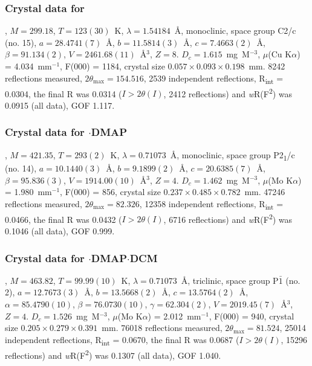 \begin{refsection}
\subsubsection{Crystal data for \texorpdfstring{}{C14 H8 N2 O Se}}
, $M=299.18$, $T=123(30)$~K, $\lambda=1.54184$~\AA, monoclinic, space group C2/c (no. 15), $a = 28.4741(7)$~\AA, $b = 11.5814(3)$~\AA, $c = 7.4663(2)$~\AA, $\beta = 91.134(2)$\degree, $V = 2461.68(11)$~\AA$^{3}$, $Z = 8$. $D_{c}= 1.615$~mg~M$^{-3}$, $\mu$(Cu K$\alpha$) = 4.034~mm$^{-1}$, F(000) = 1184, crystal size $0.057 \times 0.093 \times 0.198$~mm. 8242 reflections measured, $2\theta_{\mathrm{max}}=154.516$\degree, 2539 independent reflections, R\textsubscript{int} = 0.0304, the final R was 0.0314 ($I > 2\theta(I)$, 2412 reflections) and \emph{w}R(F\textsuperscript{2}) was 0.0915 (all data), GOF 1.117.

\subsubsection{Crystal data for \texorpdfstring{$\cdot$DMAP}{C21 H18 N4 O Se}}
, $M=421.35$, $T=293(2)$~K, $\lambda=0.71073$~\AA, monoclinic, space group P2\textsubscript{1}/c (no. 14), $a = 10.1440(3)$~\AA, $b = 9.1899(2)$~\AA, $c = 20.6385(7)$~\AA, $\beta = 95.836(3)$\degree, $V = 1914.00(10)$~\AA$^{3}$, $Z = 4$. $D_{c}= 1.462$~mg~M$^{-3}$, $\mu$(Mo K$\alpha$) = 1.980~mm$^{-1}$, F(000) = 856, crystal size $0.237 \times 0.485 \times 0.782$~mm. 47246 reflections measured, $2\theta_{\mathrm{max}}=82.326$\degree, 12358 independent reflections, R\textsubscript{int} = 0.0466, the final R was 0.0432 ($I > 2\theta(I)$, 6716 reflections) and \emph{w}R(F\textsuperscript{2}) was 0.1046 (all data), GOF 0.999.

\subsubsection{Crystal data for \texorpdfstring{$\cdot$DMAP$\cdot$DCM}{C21.50 H19 Cl N4 O Se}}
, $M=463.82$, $T=99.99(10)$~K, $\lambda=0.71073$~\AA, triclinic, space group P$\bar{1}$ (no. 2), $a = 12.7673(3)$~\AA, $b = 13.5668(2)$~\AA, $c = 13.5764(2)$~\AA, $\alpha = 85.4790(10)$\degree, $\beta = 76.0730(10)$\degree, $\gamma = 62.304(2)$\degree, $V = 2019.45(7)$~\AA$^{3}$, $Z = 4$. $D_{c}= 1.526$~mg~M$^{-3}$, $\mu$(Mo K$\alpha$) = 2.012~mm$^{-1}$, F(000) = 940, crystal size $0.205 \times 0.279 \times 0.391$~mm. 76018 reflections measured, $2\theta_{\mathrm{max}}=81.524$\degree, 25014 independent reflections, R\textsubscript{int} = 0.0670, the final R was 0.0687 ($I > 2\theta(I)$, 15296 reflections) and \emph{w}R(F\textsuperscript{2}) was 0.1307 (all data), GOF 1.040.


\end{refsection}
